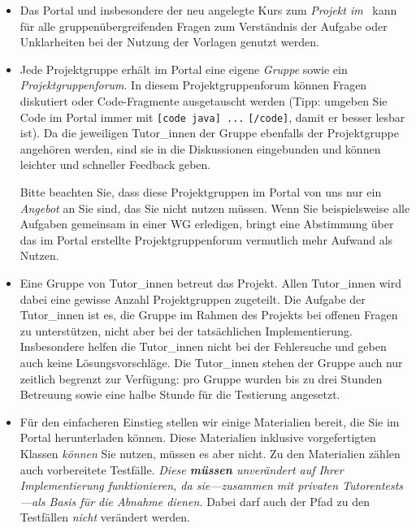 \begin{itemize}

\item Das Portal und insbesondere der neu angelegte Kurs zum \emph{Projekt im \labTerm}\ kann f\"ur alle gruppen\"ubergreifenden Fragen zum Verst\"andnis der Aufgabe oder Unklarheiten bei der Nutzung der Vorlagen genutzt werden.

\item Jede Projektgruppe erh\"alt im Portal eine eigene \emph{Gruppe} sowie ein
\emph{Projektgruppenforum}. In diesem Projektgruppenforum k\"onnen Fragen diskutiert oder
Code-Fragmente ausgetauscht werden (Tipp: umgeben Sie Code im Portal immer mit 
\verb![code java] ...! \verb![/code]!, damit er besser lesbar ist). Da die jeweiligen Tutor\_innen der Gruppe ebenfalls
der Projektgruppe angeh\"oren werden, sind sie in die Diskussionen eingebunden und k\"onnen 
leichter und schneller Feedback geben.

Bitte beachten Sie, dass diese Projektgruppen im Portal von uns nur ein \emph{Angebot} an 
Sie sind, das Sie nicht nutzen m\"ussen. Wenn Sie beispielsweise alle Aufgaben gemeinsam in 
einer WG erledigen, bringt eine Abstimmung \"uber das im 
Portal erstellte Projektgruppenforum vermutlich mehr Aufwand als Nutzen.

\item Eine Gruppe von Tutor\_innen betreut das Projekt. Allen Tutor\_innen wird dabei eine 
gewisse Anzahl Projektgruppen zugeteilt. Die Aufgabe der Tutor\_innen ist es, die Gruppe im Rahmen 
des Projekts bei offenen Fragen zu unterst\"utzen, nicht aber bei der 
tats\"achlichen Implementierung. Insbesondere helfen die Tutor\_innen nicht bei der Fehlersuche 
und geben auch keine L\"osungsvorschl\"age. Die Tutor\_innen stehen der Gruppe auch nur 
zeitlich begrenzt zur Verf\"ugung: pro Gruppe wurden bis zu drei Stunden Betreuung sowie 
eine halbe Stunde f\"ur die Testierung angesetzt.

\item F\"ur den einfacheren Einstieg stellen wir einige Materialien bereit, die
Sie im Portal herunterladen k\"onnen. Diese Materialien inklusive vorgefertigten
Klassen \emph{k\"onnen} Sie nutzen, m\"ussen es aber nicht. Zu den Materialien
z\"ahlen auch vorbereitete Testf\"alle. \emph{Diese \textbf{m\"ussen} unver\"andert auf Ihrer
Implementierung funktionieren, da sie---zusammen mit \glqq{}privaten\grqq{}
Tutorentests---als Basis f\"ur die Abnahme dienen.} Dabei darf auch der Pfad zu
den Testf\"allen \emph{nicht} ver\"andert werden.
\end{itemize}

